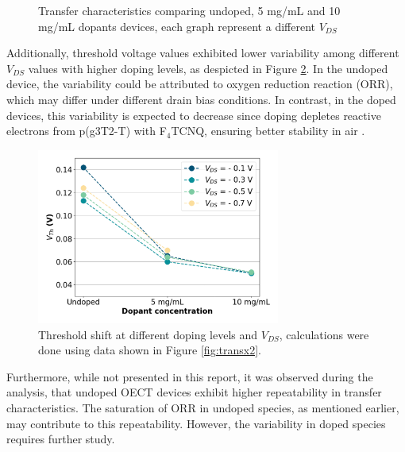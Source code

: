\begin{figure}[ht]
    \caption[Transfer characteristics comparing different doping levels]{Transfer characteristics comparing undoped, 5 mg/mL and 10 mg/mL dopants devices, each graph represent a different $V_{DS}$}
    \label{fig:shift1}
\end{figure}

Additionally, threshold voltage values exhibited lower variability among different $V_{DS}$ values with higher doping levels, as despicted in Figure \ref{fig:vth_vds}. In the undoped device, the variability could be attributed to oxygen reduction reaction (ORR), which may differ under different drain bias conditions. In contrast, in the doped devices, this variability is expected to decrease since doping depletes reactive electrons from p(g3T2-T) with F$_{4}$TCNQ, ensuring better stability in air \cite{tanTuningOrganicElectrochemical2022}. %

\begin{figure}[ht]
  \centering
  \includegraphics[width=8cm]{Images/pdf/vth_shift_vds.pdf}
  \caption[Threshold shift at different doping levels and $V_{DS}$]{Threshold shift at different doping levels and $V_{DS}$, calculations were done using data shown in Figure \ref{fig:transx2}.}
  \label{fig:vth_vds}
\end{figure}

Furthermore, while not presented in this report, it was observed during the analysis, that undoped OECT devices exhibit higher repeatability in transfer characteristics. The saturation of ORR in undoped species, as mentioned earlier, may contribute to this repeatability. However, the variability in doped species requires further study. %

